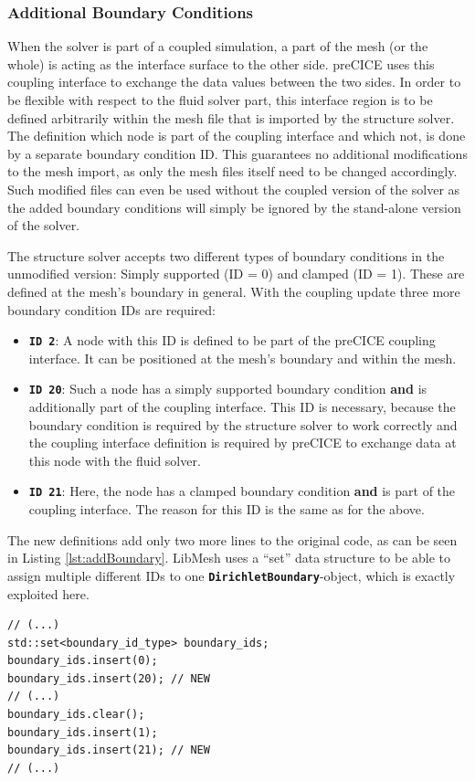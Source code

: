   \subsubsection{Additional Boundary Conditions}\label{sec:Coupl-Impl-BCs}
   When the solver is part of a coupled simulation, a part of the mesh (or the whole) is acting as the interface surface to the other side. preCICE uses this coupling interface to exchange the data values between the two sides. In order to be flexible with respect to the fluid solver part, this interface region is to be defined arbitrarily within the mesh file that is imported by the structure solver. The definition which node is part of the coupling interface and which not, is done by a separate boundary condition ID. This guarantees no additional modifications to the mesh import, as only the mesh files itself need to be changed accordingly. Such modified files can even be used without the coupled version of the solver as the added boundary conditions will simply be ignored by the stand-alone version of the solver.
   
   The structure solver accepts two different types of boundary conditions in the unmodified version: Simply supported (ID = 0) and clamped (ID = 1). These are defined at the mesh's boundary in general. With the coupling update three more boundary condition IDs are required:
   \begin{itemize}
  	\item \textbf{\texttt{ID 2}}: A node with this ID is defined to be part of the preCICE coupling interface. It can be positioned at the mesh's boundary and within the mesh.
  	\item \textbf{\texttt{ID 20}}: Such a node has a simply supported boundary condition \textbf{and} is additionally part of the coupling interface. This ID is necessary, because the boundary condition is required by the structure solver to work correctly and the coupling interface definition is required by preCICE to exchange data at this node with the fluid solver.
  	\item \textbf{\texttt{ID 21}}: Here, the node has a clamped boundary condition \textbf{and} is part of the coupling interface. The reason for this ID is the same as for the above.
   \end{itemize}
   
   The new definitions add only two more lines to the original code, as can be seen in Listing \ref{lst:addBoundary}. LibMesh uses a ``set'' data structure to be able to assign multiple different IDs to one \texttt{\textbf{DirichletBoundary}}-object, which is exactly exploited here.
\begin{lstlisting}[caption=Additional boundary condition IDs,label=lst:addBoundary,keepspaces=true]
// (...)
std::set<boundary_id_type> boundary_ids;
boundary_ids.insert(0);
boundary_ids.insert(20); // NEW
// (...)
boundary_ids.clear();
boundary_ids.insert(1);
boundary_ids.insert(21); // NEW
// (...)
\end{lstlisting}
  	

